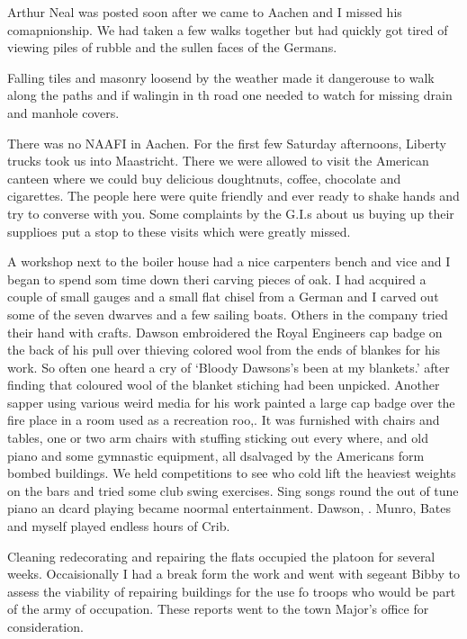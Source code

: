 Arthur Neal was posted soon after we came to Aachen and I missed his
comapnionship. We had taken a few walks together but had quickly got
tired of viewing piles of rubble and the sullen faces of the Germans.

Falling tiles and masonry loosend by the weather made it dangerouse to
walk along the paths and if walingin in th road one needed to watch
for missing drain and manhole covers.

There was no NAAFI in Aachen. For the first few Saturday afternoons,
Liberty trucks took us into Maastricht. There we were allowed to visit
the American canteen where we could buy delicious doughtnuts, coffee,
chocolate and cigarettes. The people here were quite friendly and ever
ready to shake hands and try to converse with you. Some complaints by
the G.I.s about us buying up their supplioes put a stop to these
visits which were greatly missed.

A workshop next to the boiler house had a nice carpenters bench and
vice and I began to spend som time down theri carving pieces of oak. I
had acquired a couple of small gauges and a small flat chisel from a
German and I carved out some of the seven dwarves and a few sailing
boats. Others in the company tried their hand with crafts. \Corporal
Dawson embroidered the Royal Engineers cap badge on the back of his
pull over thieving colored wool from the ends of blankes for his
work. So often one heard a cry of `Bloody Dawsons's been at my
blankets.' after finding that coloured wool of the blanket stiching
had been unpicked. Another sapper using various weird media for his
work painted a large cap badge over the fire place in a room used as a
recreation roo,. It was furnished with chairs and tables, one or two
arm chairs with stuffing sticking out every where, and old piano and
some gymnastic equipment, all dsalvaged by the Americans form bombed
buildings. We held competitions to see who cold lift the heaviest
weights on the bars and tried some club swing exercises. Sing songs
round the out of tune piano an dcard playing became noormal
entertainment. \Corporal Dawson, \lcorporals. Munro, Bates and myself played
endless hours of Crib.

Cleaning redecorating and repairing the flats occupied the platoon for
several weeks. Occaisionally I had a break form the work and went with
segeant Bibby to assess the viability of repairing buildings for the
use fo troops who would be part of the army of occupation. These
reports went to the town Major's office for consideration.

